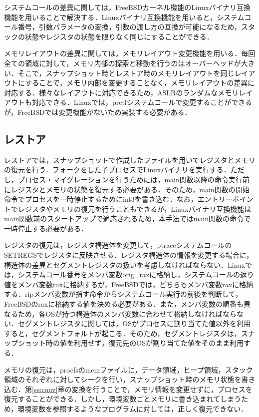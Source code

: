 \documentclass{ipsjpapers}
\begin{document}
システムコールの差異に関しては，FreeBSDカーネル機能のLinuxバイナリ互換機能\cite{linux-emu}を用いることで解決する．Linuxバイナリ互換機能を用いると，システムコール番号，引数パラメータの変換，引数の渡し方の互換が可能になるため，スタックの状態やレジスタの状態を限りなく同じにすることができる．

メモリレイアウトの差異に関しては，メモリレイアウト変更機能を用いる．毎回全ての領域に対して，メモリ内部の探索と移動を行うのはオーバーヘッドが大きい．そこで，スナップショット時とレストア時のメモリレイアウトを同じレイアウトにすることで，メモリ内部を変更することなく，メモリレイアウトの差異に対応する．様々なレイアウトに対応できるため，ASLRのランダムなメモリレイアウトも対応できる．Linuxでは，prctlシステムコールで変更することができるが，FreeBSDでは変更機能がないため実装する必要がある．
\subsection{レストア}
レストアでは，スナップショットで作成したファイルを用いてレジスタとメモリの復元を行う．フォークをした子プロセスでLinuxバイナリを実行する．ただし，プロセス・マイグレーションを行うためには，main関数以降の命令実行前にレジスタとメモリの状態を復元する必要がある．そのため，main関数の開始命令でプロセスを一時停止するためにint3を書き込む．なお，エントリーポイントでレジスタやメモリの復元を行うこともできるが，Linuxバイナリ互換機能はmain関数前のスタートアップで適応されるため，本手法ではmain関数の命令で一時停止する必要がある．

レジスタの復元は，レジスタ構造体を変更して，ptraceシステムコールのSETREGSでレジスタに反映させる．レジスタ構造体の情報を変更する場合に，構造体の差異とセグメントレジスタの扱いを考慮しなければならない．Linuxでは，システムコール番号をメンバ変数orig\_raxに格納し，システムコールの返り値をメンバ変数raxに格納するが，FreeBSDでは，どちらもメンバ変数raxに格納する．ripメンバ変数が指す命令からシステムコール実行の前後を判断して，FreeBSDのraxに格納する値を決める必要がある．また，メンバ変数の順番も異なるため，各OSが持つ構造体のメンバ変数に合わせて格納しなければならない．セグメントレジスタに関しては，OSがプロセスに割り当てた値以外を利用すると，セグメントフォルトが起こる．そのため，セグメントレジスタは，スナップショット時の値を利用せず，復元先のOSが割り当てた値をそのまま利用する．

メモリの復元は，procfsのmemファイルに，データ領域，ヒープ領域，スタック領域のそれぞれに対してシークを行い，スナップショット時のメモリ状態を書き込む．第\ref{se:conv}章の変換を行うことで，メモリ情報を変更せずに，プロセスを復元することができる．しかし，環境変数ごとメモリに書き込まれてしまうため，環境変数を参照するようなプログラムに対しては，正しく復元できない．
\end{document}
